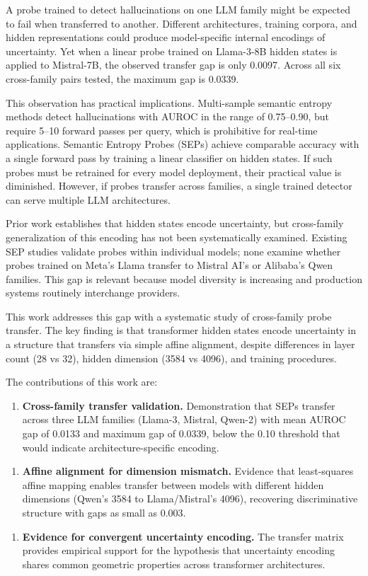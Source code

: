 
A probe trained to detect hallucinations on one LLM family might be expected to fail when transferred to another. Different architectures, training corpora, and hidden representations could produce model-specific internal encodings of uncertainty. Yet when a linear probe trained on Llama-3-8B hidden states is applied to Mistral-7B, the observed transfer gap is only 0.0097. Across all six cross-family pairs tested, the maximum gap is 0.0339.

This observation has practical implications. Multi-sample semantic entropy methods detect hallucinations with AUROC in the range of 0.75--0.90, but require 5--10 forward passes per query, which is prohibitive for real-time applications. Semantic Entropy Probes (SEPs) achieve comparable accuracy with a single forward pass by training a linear classifier on hidden states. If such probes must be retrained for every model deployment, their practical value is diminished. However, if probes transfer across families, a single trained detector can serve multiple LLM architectures.

Prior work establishes that hidden states encode uncertainty, but cross-family generalization of this encoding has not been systematically examined. Existing SEP studies validate probes within individual models; none examine whether probes trained on Meta's Llama transfer to Mistral AI's or Alibaba's Qwen families. This gap is relevant because model diversity is increasing and production systems routinely interchange providers.

This work addresses this gap with a systematic study of cross-family probe transfer. The key finding is that transformer hidden states encode uncertainty in a structure that transfers via simple affine alignment, despite differences in layer count (28 vs 32), hidden dimension (3584 vs 4096), and training procedures.

The contributions of this work are:

\begin{enumerate}
\item \textbf{Cross-family transfer validation.} Demonstration that SEPs transfer across three LLM families (Llama-3, Mistral, Qwen-2) with mean AUROC gap of 0.0133 and maximum gap of 0.0339, below the 0.10 threshold that would indicate architecture-specific encoding.
\end{enumerate}

\begin{enumerate}
\item \textbf{Affine alignment for dimension mismatch.} Evidence that least-squares affine mapping enables transfer between models with different hidden dimensions (Qwen's 3584 to Llama/Mistral's 4096), recovering discriminative structure with gaps as small as 0.003.
\end{enumerate}

\begin{enumerate}
\item \textbf{Evidence for convergent uncertainty encoding.} The transfer matrix provides empirical support for the hypothesis that uncertainty encoding shares common geometric properties across transformer architectures.
\end{enumerate}
